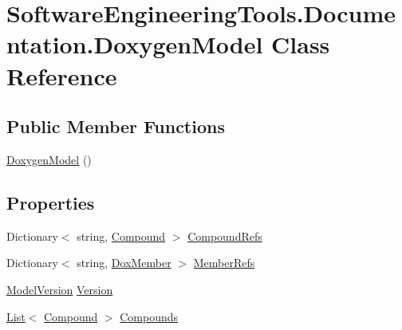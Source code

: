 \hypertarget{class_software_engineering_tools_1_1_documentation_1_1_doxygen_model}{\section{Software\+Engineering\+Tools.\+Documentation.\+Doxygen\+Model Class Reference}
\label{class_software_engineering_tools_1_1_documentation_1_1_doxygen_model}
}
\subsection*{Public Member Functions}
\begin{DoxyCompactItemize}
\item 
\hyperlink{class_software_engineering_tools_1_1_documentation_1_1_doxygen_model_a31cf5108804d276a3fdd4389b87066e5}{Doxygen\+Model} ()
\end{DoxyCompactItemize}
\subsection*{Properties}
\begin{DoxyCompactItemize}
\item 
Dictionary$<$ string, \hyperlink{class_software_engineering_tools_1_1_documentation_1_1_compound}{Compound} $>$ \hyperlink{class_software_engineering_tools_1_1_documentation_1_1_doxygen_model_aca1bd90e5926767d75f0ce49de702d7f}{Compound\+Refs}
\item 
Dictionary$<$ string, \hyperlink{class_software_engineering_tools_1_1_documentation_1_1_dox_member}{Dox\+Member} $>$ \hyperlink{class_software_engineering_tools_1_1_documentation_1_1_doxygen_model_ae96d35852eb333d0653ea4f0f15e1d95}{Member\+Refs}
\item 
\hyperlink{struct_software_engineering_tools_1_1_documentation_1_1_model_version}{Model\+Version} \hyperlink{class_software_engineering_tools_1_1_documentation_1_1_doxygen_model_a8ec831e8902cd1fde6146631e6bf13c9}{Version}
\item 
\hyperlink{namespace_software_engineering_tools_1_1_documentation_ae0bccf4f49a76db084c1c316e5954ec9a4ee29ca12c7d126654bd0e5275de6135}{List}$<$ \hyperlink{class_software_engineering_tools_1_1_documentation_1_1_compound}{Compound} $>$ \hyperlink{class_software_engineering_tools_1_1_documentation_1_1_doxygen_model_ab07d3d395d1701a66e1d5f6f73ce7d61}{Compounds}
\end{DoxyCompactItemize}



